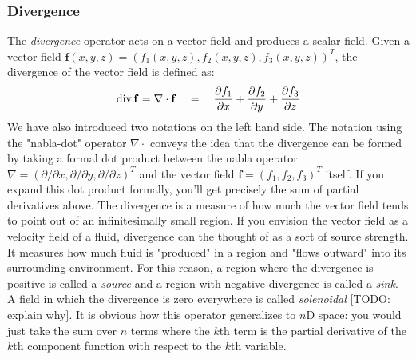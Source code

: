 \subsubsection{Divergence}
The \emph{divergence} operator acts on a vector field and produces a scalar field. Given a vector field $\mathbf{f}(x,y,z) = (f_1(x,y,z), f_2(x,y,z), f_3(x,y,z))^T$, the divergence of the vector field is defined as:
\begin{equation}
 \operatorname{div} \mathbf{f} = \nabla \cdot \mathbf{f}  \quad = \quad
 \frac{\partial f_1}{\partial x} + 
 \frac{\partial f_2}{\partial y} + 
 \frac{\partial f_3}{\partial z}
\end{equation}
We have also introduced two notations on the left hand side. The notation using the "nabla-dot" operator $\nabla \cdot$ conveys the idea that the divergence can be formed by taking a formal dot product between the nabla operator $\nabla = (\partial / \partial x, \partial / \partial y, \partial / \partial z)^T$ and the vector field $\mathbf{f} = (f_1, f_2, f_3)^T$ itself. If you expand this dot product formally, you'll get precisely the sum of partial derivatives above. The divergence is a measure of how much the vector field tends to point out of an infinitesimally small region. If you envision the vector field as a velocity field of a fluid, divergence can the thought of as a sort of source strength. It measures how much fluid is "produced" in a region and "flows outward" into its surrounding environment. For this reason, a region where the divergence is positive is called a \emph{source} and a region with negative divergence is called a \emph{sink}. A field in which the divergence is zero everywhere is called \emph{solenoidal} [TODO: explain why]. It is obvious how this operator generalizes to $n$D space: you would just take the sum over $n$ terms where the $k$th term is the partial derivative of the $k$th component function with respect to the $k$th variable.


